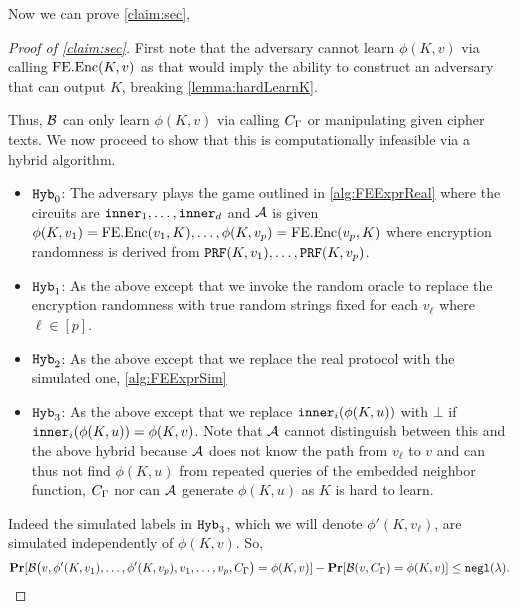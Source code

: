 Now we can prove \cref{claim:sec},
\begin{proof}[Proof of \cref{claim:sec}]
First note that the adversary cannot learn $\phi(K, v)$ via calling $\text{FE.Enc}(K, v)$ as
that would imply the ability to construct an adversary that can output $K$, breaking \cref{lemma:hardLearnK}.

Thus, $\mathcal{B}$ can only learn $\phi(K, v)$ via calling $C_\Gamma$ or manipulating given cipher texts.
We now proceed to show that this is computationally infeasible via a hybrid algorithm.

\begin{itemize}
	\item $\texttt{Hyb}_0$: The adversary plays the game outlined in \cref{alg:FEExprReal} where the circuits are $\texttt{inner}_1, \dots, \texttt{inner}_d$
	and $\mathcal{A}$ is given $\phi(K, v_1) = \text{FE.Enc}(v_1, K), \dots, \phi(K, v_p) = \text{FE.Enc}(v_p, K)$ where encryption randomness is derived from $\texttt{PRF}(K, v_1), \dots, \texttt{PRF}(K, v_p)$.
	\item $\texttt{Hyb}_1$: As the above except that we invoke the random oracle to replace the encryption randomness with true random strings fixed for each $v_\ell$ where $\ell \in [p]$.
	\item $\texttt{Hyb}_2$: As the above except that we replace the real protocol with the simulated one, \cref{alg:FEExprSim}
	\item $\texttt{Hyb}_3$: As the above except that we replace $\texttt{inner}_i(\phi(K, u))$ with $\bot$ if $\texttt{inner}_i(\phi(K, u)) = \phi(K, v)$.
	Note that $\mathcal{A}$ cannot distinguish between this and the above hybrid
	because $\mathcal{A}$ does not know the path from $v_\ell$ to $v$
	and can thus not find $\phi(K, u)$ from repeated queries of the embedded neighbor function, $C_\Gamma$
	nor can $\mathcal{A}$ generate $\phi(K, u)$ as $K$ is hard to learn.
\end{itemize}

Indeed the simulated labels in $\texttt{Hyb}_3$, which we will denote $\phi'(K, v_\ell)$, are simulated independently of $\phi(K, v)$.
So,
\begin{equation*}
		\operatorname*{\mathbf{Pr}}[\mathcal{B}\big(v, \phi'(K, v_1), \dots, \phi'(K, v_p), v_1, \dots, v_p, C_\Gamma\big) = \phi(K, v)]
			 - \operatorname*{\mathbf{Pr}}[\mathcal{B}(v, C_\Gamma) = \phi(K, v)]
	\leq \texttt{negl}(\lambda).
\end{equation*}


\end{proof}
